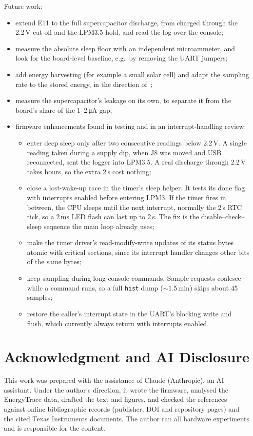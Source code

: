 \documentclass[conference]{IEEEtran}
\newcommand{\uA}{\,\si{\micro\ampere}}
\newcommand{\code}[1]{\texttt{#1}}
\begin{document}
Future work:
\begin{itemize}
  \item extend E11 to the full supercapacitor discharge, from charged through the 2.2\,V cut-off and the LPM3.5 hold, and read the log over the console;
  \item measure the absolute sleep floor with an independent microammeter, and look for the board-level baseline, e.g.\ by removing the UART jumpers;
  \item add energy harvesting (for example a small solar cell) and adapt the sampling rate to the stored energy, in the direction of~\cite{colin2018capybara,hester2017future};
  \item measure the supercapacitor's leakage on its own, to separate it from the board's share of the 1--2\uA{} gap;
  \item firmware enhancements found in testing and in an interrupt-handling review:
  \begin{itemize}
    \item enter deep sleep only after two consecutive readings below 2.2\,V. A single reading taken during a supply dip, when J8 was moved and USB reconnected, sent the logger into LPM3.5. A real discharge through 2.2\,V takes hours, so the extra 2\,s cost nothing;
    \item close a lost-wake-up race in the timer's sleep helper. It tests its done flag with interrupts enabled before entering LPM3. If the timer fires in between, the CPU sleeps until the next interrupt, normally the 2\,s RTC tick, so a 2\,ms LED flash can last up to 2\,s. The fix is the disable--check--sleep sequence the main loop already uses;
    \item make the timer driver's read-modify-write updates of its status bytes atomic with critical sections, since its interrupt handler changes other bits of the same bytes;
    \item keep sampling during long console commands. Sample requests coalesce while a command runs, so a full \code{hist} dump ($\sim$1.5\,min) skips about 45 samples;
    \item restore the caller's interrupt state in the UART's blocking write and flush, which currently always return with interrupts enabled.
  \end{itemize}
\end{itemize}

\section*{Acknowledgment and AI Disclosure}
This work was prepared with the assistance of Claude (Anthropic), an AI assistant. Under the author's direction, it wrote the firmware, analysed the EnergyTrace data, drafted the text and figures, and checked the references against online bibliographic records (publisher, DOI and repository pages) and the cited Texas Instruments documents. The author ran all hardware experiments and is responsible for the content.
\end{document}
